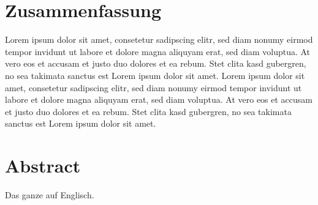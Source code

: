 \documentclass[12pt,a4paper,bibliography=totocnumbered,listof=totocnumbered]{scrartcl}
\begin{document}
\setcounter{page}{1}
\onehalfspacing
{}
\section{Zusammenfassung}

Lorem ipsum dolor sit amet, consetetur sadipscing elitr, sed diam nonumy eirmod tempor invidunt ut labore et dolore magna aliquyam erat, sed diam voluptua. At vero eos et accusam et justo duo dolores et ea rebum. Stet clita kasd gubergren, no sea takimata sanctus est Lorem ipsum dolor sit amet. Lorem ipsum dolor sit amet, consetetur sadipscing elitr, sed diam nonumy eirmod tempor invidunt ut labore et dolore magna aliquyam erat, sed diam voluptua. At vero eos et accusam et justo duo dolores et ea rebum. Stet clita kasd gubergren, no sea takimata sanctus est Lorem ipsum dolor sit amet.

\vspace{-1,2em}
\section*{Abstract}
Das ganze auf Englisch.
\pagebreak

\renewcommand{\cfttabpresnum}{Tab. }
\renewcommand{\cftfigpresnum}{Abb. }
\settowidth{\cfttabnumwidth}{Abb. 10\quad}
\settowidth{\cftfignumwidth}{Abb. 10\quad}

\singlespacing
{}
\renewcommand{\contentsname}{II Inhaltsverzeichnis}
{}
\addtocounter{section}{1}
\tableofcontents
\pagebreak
{}
\listoffigures
\pagebreak
\listoftables
\renewcommand{\lstlistlistingname}{Listing-Verzeichnis}
{\lstlistoflistings}
\pagebreak
\end{document}
